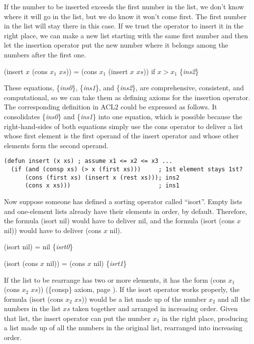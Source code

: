If the number to be inserted exceeds the first number
in the list, we don't know where it will go in the list,
but we do know it won't come first.
The first number in the list will stay there in this case.
If we trust the operator to insert it in the right place,
we can make a new list starting with the same first number
and then  let the insertion operator put the new number
where it belongs among the numbers after the first one.

\hspace{1cm} (insert $x$ (cons $x_1$ $xs$)) = (cons $x_1$ (insert $x$ $xs$)) if $x > x_1$
\hfill \{\emph{ins2}\}

These equations, \{\emph{ins0}\}, \{\emph{ins1}\}, and \{\emph{ins2}\},
are comprehensive, consistent, and computational,
so we can take them as defining axioms for the insertion operator.
The corresponding definition in ACL2 could be expressed as follows.
It consolidates \{\emph{ins0}\} and \{\emph{ins1}\} into one equation,
which is possible because the right-hand-sides of both equations
simply use the cons operator to deliver a list whose first element
is the first operand of the insert operator and whose other elements
form the second operand.

\label{defun:insert-isort}
\begin{Verbatim}
(defun insert (x xs) ; assume x1 <= x2 <= x3 ...
  (if (and (consp xs) (> x (first xs)))     ; 1st element stays 1st?
      (cons (first xs) (insert x (rest xs))); ins2
      (cons x xs)))                         ; ins1
\end{Verbatim}

Now suppose someone has defined a sorting operator called ``isort''.
Empty lists and one-element lists already have their
elements in order, by default.
Therefore, the formula (isort nil) would have to deliver nil,
and the formula (isort (cons $x$ nil)) would have to deliver
(cons $x$ nil).

\label{eq:isrt0}
\hspace{1cm} (isort nil) = nil \hfill \{\emph{isrt0}\}

\label{eq:isrt1}
\hspace{1cm} (isort (cons $x$ nil)) = (cons $x$ nil) \hfill \{\emph{isrt1}\}

If the list to be rearrange has two or more elements,
it has the form (cons $x_1$ (cons $x_2$ $xs$)) (\{consp\} axiom, page \pageref{consp-axiom}).
If the isort operator works properly,
the formula (isort (cons $x_2$ $xs$)) would be
a list made up of the number $x_2$ and all the numbers in the list $xs$
taken together and
arranged in increasing order.
Given that list, the insert operator can put the number $x_1$ in
the right place, producing a list made up of all the
numbers in the original list, rearranged into increasing order.

